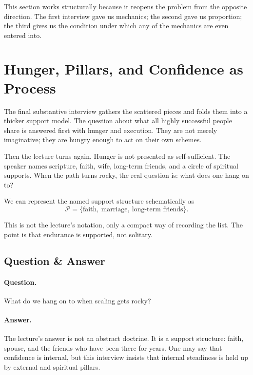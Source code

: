 This section works structurally because it reopens the problem from the opposite direction. The first interview gave us mechanics; the second gave us proportion; the third gives us the condition under which any of the mechanics are even entered into.

\section{Hunger, Pillars, and Confidence as Process}

The final substantive interview gathers the scattered pieces and folds them into a thicker support model. The question about what all highly successful people share is answered first with hunger and execution. They are not merely imaginative; they are hungry enough to act on their own schemes.

Then the lecture turns again. Hunger is not presented as self-sufficient. The speaker names scripture, faith, wife, long-term friends, and a circle of spiritual supports. When the path turns rocky, the real question is: what does one hang on to?

We can represent the named support structure schematically as
\begin{equation}
\mathcal{P}=\{\text{faith},\ \text{marriage},\ \text{long-term friends}\}.
\end{equation}

This is not the lecture's notation, only a compact way of recording the list. The point is that endurance is supported, not solitary.

\subsection{Question \& Answer}

\paragraph{Question.}
What do we hang on to when scaling gets rocky?

\paragraph{Answer.}
The lecture's answer is not an abstract doctrine. It is a support structure: faith, spouse, and the friends who have been there for years. One may say that confidence is internal, but this interview insists that internal steadiness is held up by external and spiritual pillars.

